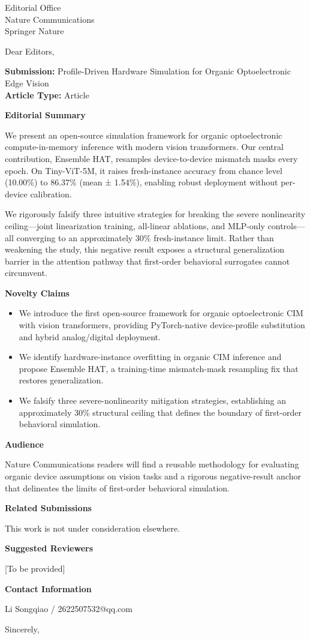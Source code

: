 \documentclass[11pt,a4paper]{letter}
\begin{document}
\begin{letter}{Editorial Office\\Nature Communications\\Springer Nature}

\opening{Dear Editors,}
\vspace{-1em}

\noindent\textbf{Submission:} Profile-Driven Hardware Simulation for Organic Optoelectronic Edge Vision\\
\textbf{Article Type:} Article

\textbf{Editorial Summary}

We present an open-source simulation framework for organic optoelectronic compute-in-memory inference with modern vision transformers. Our central contribution, Ensemble HAT, resamples device-to-device mismatch masks every epoch. On Tiny-ViT-5M, it raises fresh-instance accuracy from chance level (10.00\%) to 86.37\% (mean ± 1.54\%), enabling robust deployment without per-device calibration.

We rigorously falsify three intuitive strategies for breaking the severe nonlinearity ceiling---joint linearization training, all-linear ablations, and MLP-only controls---all converging to an approximately 30\% fresh-instance limit. Rather than weakening the study, this negative result exposes a structural generalization barrier in the attention pathway that first-order behavioral surrogates cannot circumvent.

\textbf{Novelty Claims}
\begin{itemize}
    \item We introduce the first open-source framework for organic optoelectronic CIM with vision transformers, providing PyTorch-native device-profile substitution and hybrid analog/digital deployment.
    \item We identify hardware-instance overfitting in organic CIM inference and propose Ensemble HAT, a training-time mismatch-mask resampling fix that restores generalization.
    \item We falsify three severe-nonlinearity mitigation strategies, establishing an approximately 30\% structural ceiling that defines the boundary of first-order behavioral simulation.
\end{itemize}

\textbf{Audience}

Nature Communications readers will find a reusable methodology for evaluating organic device assumptions on vision tasks and a rigorous negative-result anchor that delineates the limits of first-order behavioral simulation.

\textbf{Related Submissions}

This work is not under consideration elsewhere.

\textbf{Suggested Reviewers}

[To be provided]

\textbf{Contact Information}

Li Songqiao / 2622507532@qq.com

\closing{Sincerely,}

\end{letter}
\end{document}
